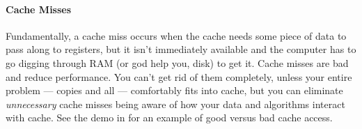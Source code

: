 \paragraph{Cache Misses} Fundamentally, a cache miss occurs when the cache 
needs some piece of data to pass along to registers, but it isn't immediately 
available and the computer has to go digging through RAM (or god help you, 
disk) to get it.  Cache misses are bad and reduce performance.  You can't get 
rid of them completely, unless your entire problem --- copies and all --- 
comfortably fits into cache, but you can eliminate \emph{unnecessary} cache 
misses being aware of how your data and algorithms interact with cache.  See 
the demo  in \thispackage for an example of good versus 
bad cache access.
